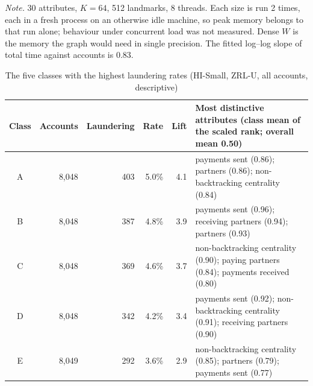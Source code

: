 \begin{table}[t]
\caption{Cost of one complete fit as the number of accounts grows}
\label{tab:scale}
\centering
\footnotesize
{}
\par\vspace{3pt}\parbox{0.98\columnwidth}{\footnotesize \emph{Note.} 30 attributes, $K=64$, 512 landmarks, 8 threads. Each size is run 2 times, each in a fresh process on an otherwise idle machine, so peak memory belongs to that run alone; behaviour under concurrent load was not measured. Dense $W$ is the memory the graph would need in single precision. The fitted log--log slope of total time against accounts is 0.83.}
\end{table}

\begin{table}[t]
\caption{The five classes with the highest laundering rates (HI-Small, ZRL-U, all accounts, descriptive)}
\label{tab:classes}
\centering
\footnotesize
\begin{tabular}{@{}crrrrl@{}}
\toprule
Class & Accounts & Laundering & Rate & Lift & Most distinctive attributes (class mean of the scaled rank; overall mean 0.50) \\
\midrule
A & 8,048 & 403 & 5.0\% & 4.1 & payments sent (0.86); partners (0.86); non-backtracking centrality (0.84) \\
B & 8,048 & 387 & 4.8\% & 3.9 & payments sent (0.96); receiving partners (0.94); partners (0.93) \\
C & 8,048 & 369 & 4.6\% & 3.7 & non-backtracking centrality (0.90); paying partners (0.84); payments received (0.80) \\
D & 8,048 & 342 & 4.2\% & 3.4 & payments sent (0.92); non-backtracking centrality (0.91); receiving partners (0.90) \\
E & 8,049 & 292 & 3.6\% & 2.9 & non-backtracking centrality (0.85); partners (0.79); payments sent (0.77) \\
\bottomrule
\end{tabular}
\end{table}
